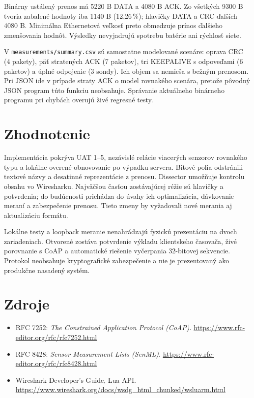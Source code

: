 \documentclass[12pt,a4paper]{article}
\begin{document}
Binárny ustálený prenos má 5220 B DATA a 4080 B ACK. Zo všetkých 9300 B tvoria zabalené hodnoty iba 1140 B (12,26\,\%); hlavičky DATA a CRC ďalších 4080 B. Minimálna Ethernetová veľkosť preto obmedzuje prínos ďalšieho zmenšovania hodnôt. Výsledky nevyjadrujú spotrebu batérie ani rýchlosť siete.

V \texttt{measurements/summary.csv} sú samostatne modelované scenáre: oprava CRC (4 pakety), päť stratených ACK (7 paketov), tri KEEPALIVE s odpoveďami (6 paketov) a úplné odpojenie (3 sondy). Ich objem sa nemieša s bežným prenosom. Pri JSON ide v prípade straty ACK o model rovnakého scenára, pretože pôvodný JSON program túto funkciu neobsahuje. Správanie aktuálneho binárneho programu pri chybách overujú živé regresné testy.

\section{Zhodnotenie}

Implementácia pokrýva UAT 1--5, nezávislé relácie viacerých senzorov rovnakého typu a lokálne overené obnovovanie po výpadku servera. Bitové polia odstránili textové názvy a desatinné reprezentácie z prenosu. Dissector umožňuje kontrolu obsahu vo Wiresharku. Najväčšou časťou zostávajúcej réžie sú hlavičky a potvrdenia; do budúcnosti prichádza do úvahy ich optimalizácia, dávkovanie meraní a zabezpečenie prenosu. Tieto zmeny by vyžadovali nové merania aj aktualizáciu formátu.

Lokálne testy a loopback meranie nenahrádzajú fyzickú prezentáciu na dvoch zariadeniach. Otvorené zostáva potvrdenie výkladu klientskeho časovača, živé porovnanie s CoAP a automatické riešenie vyčerpania 32-bitovej sekvencie. Protokol neobsahuje kryptografické zabezpečenie a nie je prezentovaný ako produkčne nasadený systém.

\section{Zdroje}
\begin{itemize}
\item RFC 7252: \emph{The Constrained Application Protocol (CoAP)}. \url{https://www.rfc-editor.org/rfc/rfc7252.html}
\item RFC 8428: \emph{Sensor Measurement Lists (SenML)}. \url{https://www.rfc-editor.org/rfc/rfc8428.html}
\item Wireshark Developer's Guide, Lua API. \url{https://www.wireshark.org/docs/wsdg_html_chunked/wsluarm.html}
\end{itemize}
\end{document}
